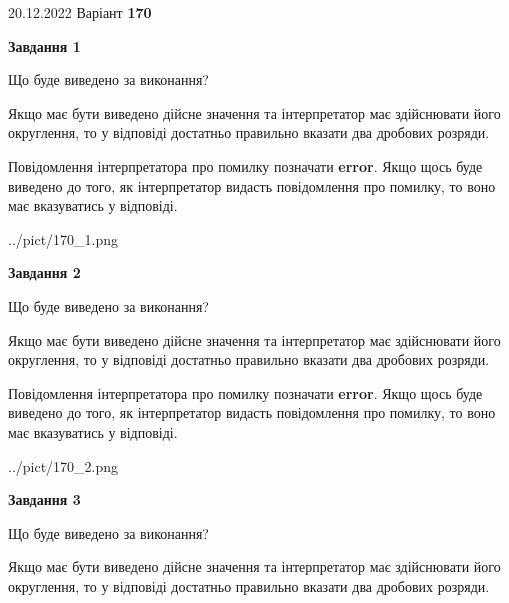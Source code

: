 \documentclass[12pt, ukrainian]{article}
\begin{document}
{20.12.2022 Варіант \No \textbf { 170 }\par}
{
\begin {Large}

{\begin {center}\textbf{Завдання 1}\end {center}}\par
Що буде виведено за виконання? \par

Якщо має бути виведено дійсне значення та інтерпретатор має здійснювати його округлення, 
то у відповіді достатньо правильно вказати два дробових розряди.

Повідомлення інтерпретатора про помилку позначати \textbf{error}.
Якщо щось буде виведено до того, як інтерпретатор видасть повідомлення про помилку, 
то воно має вказуватись у відповіді. \par

\begin{center}
	{../pict/170_1.png}
\end{center}
\newpage

{\begin {center}\textbf{Завдання 2}\end {center}}\par
Що буде виведено за виконання? \par

Якщо має бути виведено дійсне значення та інтерпретатор має здійснювати його округлення, 
то у відповіді достатньо правильно вказати два дробових розряди.

Повідомлення інтерпретатора про помилку позначати \textbf{error}.
Якщо щось буде виведено до того, як інтерпретатор видасть повідомлення про помилку, 
то воно має вказуватись у відповіді. \par

\begin{center}
	{../pict/170_2.png}
\end{center}
\newpage

{\begin {center}\textbf{Завдання 3}\end {center}}\par
Що буде виведено за виконання? \par

Якщо має бути виведено дійсне значення та інтерпретатор має здійснювати його округлення, 
то у відповіді достатньо правильно вказати два дробових розряди.


\end{Large}}
\end{document}
